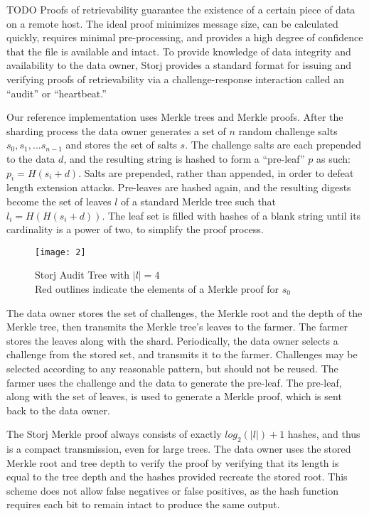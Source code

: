 \documentclass[a4paper,10pt]{article}
\newcommand{\todo}[1]{{\color{red} TODO #1}}
\begin{document}
\todo{
Proofs of retrievability guarantee the existence of a certain piece of data on a
remote host. The ideal proof minimizes message size, can be calculated quickly,
requires minimal pre-processing, and provides a high degree of confidence that
the file is available and intact. To provide knowledge of data integrity and
availability to the data owner, Storj provides a standard format for issuing and
verifying proofs of retrievability via a challenge-response interaction called
an “audit” or “heartbeat.”

Our reference implementation uses Merkle trees \cite{5} and Merkle proofs. After
the sharding process the data owner generates a set of $ n $ random challenge
salts $ s_{0}, s_{1}, ... s_{n-1} $ and stores the set of salts $ s $. The
challenge salts are each prepended to the data $ d $, and the resulting string
is hashed to form a “pre-leaf” $ p $ as such: $ p_{i} = H(s_{i} + d) $. Salts
are prepended, rather than appended, in order to defeat length extension
attacks. Pre-leaves are hashed again, and the resulting digests become the set
of leaves $ l $ of a standard Merkle tree such that $ l_{i} = H(H(s_{i} + d)) $.
The leaf set is filled with hashes of a blank string until its cardinality is a
power of two, to simplify the proof process.

\begin{figure}[hbt]
\centering
\texttt{[image: 2]}
\caption{Storj Audit Tree with $ |l| = 4 $\\Red outlines indicate the elements
of a Merkle proof for $ s_{0} $}
\end{figure}

The data owner stores the set of challenges, the Merkle root and the depth of
the Merkle tree, then transmits the Merkle tree’s leaves to the farmer. The
farmer stores the leaves along with the shard. Periodically, the data owner
selects a challenge from the stored set, and transmits it to the farmer.
Challenges may be selected according to any reasonable pattern, but should not
be reused. The farmer uses the challenge and the data to generate the pre-leaf.
The pre-leaf, along with the set of leaves, is used to generate a Merkle proof,
which is sent back to the data owner.

The Storj Merkle proof always consists of exactly $ log_{2}(|l|)+1 $ hashes, and
thus is a compact transmission, even for large trees. The data owner uses the
stored Merkle root and tree depth to verify the proof by verifying that its
length is equal to the tree depth and the hashes provided recreate the stored
root. This scheme does not allow false negatives or false positives, as the hash
function requires each bit to remain intact to produce the same output.
}
\end{document}
